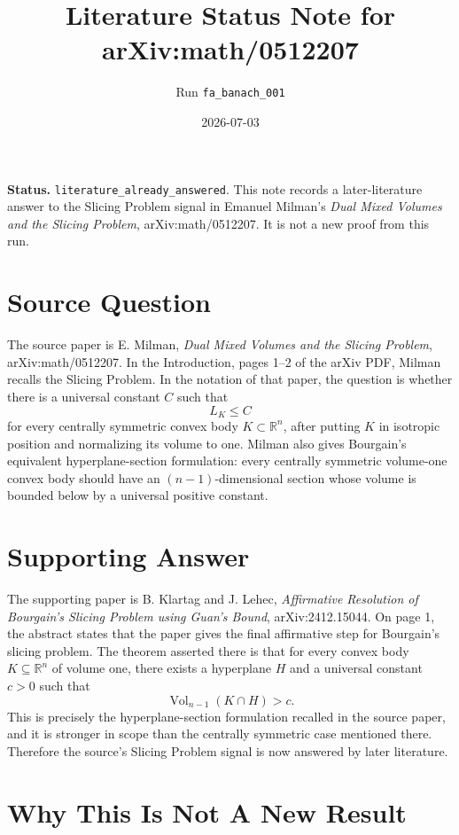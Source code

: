 \documentclass[11pt]{article}
\title{Literature Status Note for arXiv:math/0512207}
\author{Run \texttt{fa\_banach\_001}}
\date{2026-07-03}
\begin{document}
\maketitle

\noindent\textbf{Status.}
\texttt{literature\_already\_answered}. This note records a later-literature
answer to the Slicing Problem signal in Emanuel Milman's
\emph{Dual Mixed Volumes and the Slicing Problem}, arXiv:math/0512207. It is
not a new proof from this run.

\section*{Source Question}

The source paper is E. Milman, \emph{Dual Mixed Volumes and the Slicing
Problem}, arXiv:math/0512207.
In the Introduction, pages 1--2 of the arXiv PDF, Milman recalls the
Slicing Problem. In the notation of that paper, the question is whether
there is a universal constant \(C\) such that
\[
  L_K \leq C
\]
for every centrally symmetric convex body \(K \subset \mathbb{R}^n\), after
putting \(K\) in isotropic position and normalizing its volume to one.
Milman also gives Bourgain's equivalent hyperplane-section formulation: every
centrally symmetric volume-one convex body should have an \((n-1)\)-dimensional
section whose volume is bounded below by a universal positive constant.

\section*{Supporting Answer}

The supporting paper is B. Klartag and J. Lehec, \emph{Affirmative Resolution
of Bourgain's Slicing Problem using Guan's Bound}, arXiv:2412.15044.
On page 1, the abstract states that the paper gives the final affirmative
step for Bourgain's slicing problem. The theorem asserted there is that for
every convex body \(K \subseteq \mathbb{R}^n\) of volume one, there exists a
hyperplane \(H\) and a universal constant \(c>0\) such that
\[
  \operatorname{Vol}_{n-1}(K \cap H) > c .
\]
This is precisely the hyperplane-section formulation recalled in the source
paper, and it is stronger in scope than the centrally symmetric case mentioned
there. Therefore the source's Slicing Problem signal is now answered by later
literature.

\section*{Why This Is Not A New Result}
\end{document}
